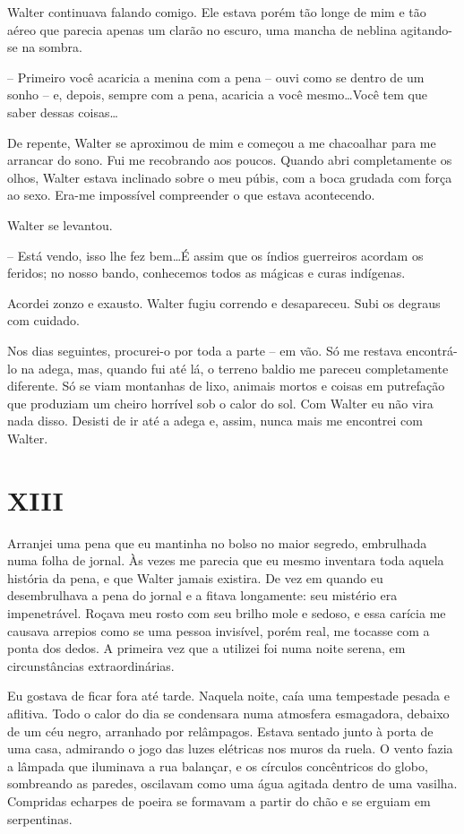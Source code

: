 Walter continuava falando comigo. Ele estava porém tão longe de mim e tão aéreo que parecia apenas um clarão no escuro, uma mancha de neblina agitando-se na sombra.

-- Primeiro você acaricia a menina com a pena -- ouvi como se dentro de um sonho -- e, depois, sempre com a pena, acaricia a você mesmo\dots Você tem que saber dessas coisas\dots

De repente, Walter se aproximou de mim e começou a me chacoalhar para me arrancar do sono. Fui me recobrando aos poucos. Quando abri completamente os olhos, Walter estava inclinado sobre o meu púbis, com a boca grudada com força ao sexo. Era-me impossível compreender o que estava acontecendo.

Walter se levantou.

-- Está vendo, isso lhe fez bem\dots É assim que os índios guerreiros acordam os feridos; no nosso bando, conhecemos todos as mágicas e curas indígenas.

Acordei zonzo e exausto. Walter fugiu correndo e desapareceu. Subi os degraus com cuidado.

Nos dias seguintes, procurei-o por toda a parte -- em vão. Só me restava encontrá-lo na adega, mas, quando fui até lá, o terreno baldio me pareceu completamente diferente. Só se viam montanhas de lixo, animais mortos e coisas em putrefação que produziam um cheiro horrível sob o calor do sol. Com Walter eu não vira nada disso. Desisti de ir até a adega e, assim, nunca mais me encontrei com Walter.


\chapter*{\centering\Large{XIII}}

Arranjei uma pena que eu mantinha no bolso no maior segredo, embrulhada numa folha de jornal. Às vezes me parecia que eu mesmo inventara toda aquela história da pena, e que Walter jamais existira. De vez em quando eu desembrulhava a pena do jornal e a fitava longamente: seu mistério era impenetrável. Roçava meu rosto com seu brilho mole e sedoso, e essa carícia me causava arrepios como se uma pessoa invisível, porém real, me tocasse com a ponta dos dedos. A primeira vez que a utilizei foi numa noite serena, em circunstâncias extraordinárias.

Eu gostava de ficar fora até tarde. Naquela noite, caía uma tempestade pesada e aflitiva. Todo o calor do dia se condensara numa atmosfera esmagadora, debaixo de um céu negro, arranhado por relâmpagos. Estava sentado junto à porta de uma casa, admirando o jogo das luzes elétricas nos muros da ruela. O vento fazia a lâmpada que iluminava a rua balançar, e os círculos concêntricos do globo, sombreando as paredes, oscilavam como uma água agitada dentro de uma vasilha. Compridas echarpes de poeira se formavam a partir do chão e se erguiam em serpentinas.

